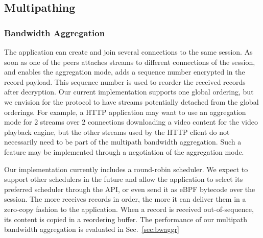


\subsection{Multipathing}

\subsubsection{Bandwidth Aggregation}
The application can create and join several \tcp connections to
the same \tcpls session. As soon as one of the peers attaches streams to
different \tcp connections of the session, and enables the aggregation mode,
\tcpls adds a sequence number encrypted in the \tls record payload. This
sequence number is used to reorder the received records after decryption. Our
current implementation supports one global ordering, but
we envision for the \tcpls protocol to have streams potentially detached from
the global orderings. For example, a HTTP application may want to use an
aggregation mode for 2 streams over 2 \tcp connections downloading a video
content for the video playback engine, but the other streams used by the HTTP
client do not necessarily need to be part of the multipath bandwidth aggregation.
Such a feature may be implemented through a negotiation of the aggregation
mode.

Our implementation currently includes a round-robin scheduler. We expect to
support other schedulers in the future and allow the application to select its preferred scheduler through the API, or even send it as eBPF bytecode over the session. The more \tcpls receives records in order, the more it can deliver them in a zero-copy fashion to the application. When a record is received out-of-sequence, its content is copied in a reordering buffer. The performance of our multipath bandwidth aggregation is evaluated in Sec.~\ref{sec:bwaggr}

